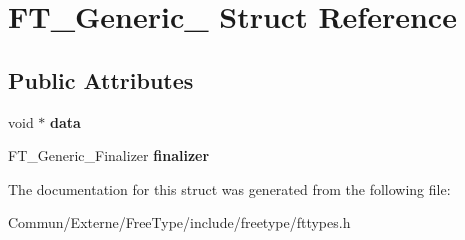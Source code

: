 \hypertarget{struct_f_t___generic__}{}\section{F\+T\+\_\+\+Generic\+\_\+ Struct Reference}
\label{struct_f_t___generic__}
\subsection*{Public Attributes}
\begin{DoxyCompactItemize}
\item 
void $\ast$ {\bfseries data}\hypertarget{struct_f_t___generic___af0bf8b983254b662f293e9a20505e27e}{}\label{struct_f_t___generic___af0bf8b983254b662f293e9a20505e27e}

\item 
F\+T\+\_\+\+Generic\+\_\+\+Finalizer {\bfseries finalizer}\hypertarget{struct_f_t___generic___a20fce8de90cc9e3876935817247b9ccc}{}\label{struct_f_t___generic___a20fce8de90cc9e3876935817247b9ccc}

\end{DoxyCompactItemize}


The documentation for this struct was generated from the following file\+:\begin{DoxyCompactItemize}
\item 
Commun/\+Externe/\+Free\+Type/include/freetype/fttypes.\+h\end{DoxyCompactItemize}
